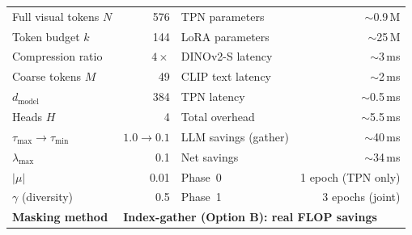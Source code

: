 \documentclass[11pt,a4paper]{article}
\begin{document}
\begin{keybox}[title={Key Numbers at a Glance}]
\renewcommand{\arraystretch}{1.15}
\small
\begin{tabular}{@{}lr||lr@{}}
  Full visual tokens $N$   & 576  & TPN parameters      & $\sim$0.9\,M \\
  Token budget $k$         & 144  & LoRA parameters     & $\sim$25\,M  \\
  Compression ratio        & $4\times$ & DINOv2-S latency & $\sim$3\,ms \\
  Coarse tokens $M$        & 49   & CLIP text latency   & $\sim$2\,ms  \\
  $d_{\text{model}}$       & 384  & TPN latency         & $\sim$0.5\,ms \\
  Heads $H$                & 4    & Total overhead      & $\sim$5.5\,ms \\
  $\tau_{\max}\to\tau_{\min}$ & $1.0\to0.1$ & LLM savings (gather) & $\sim$40\,ms \\
  $\lambda_{\max}$         & 0.1  & Net savings         & $\sim$34\,ms \\
  $|\mu|$                  & 0.01 & Phase~0             & 1 epoch (TPN only) \\
  $\gamma$ (diversity)     & 0.5  & Phase~1             & 3 epochs (joint) \\
  \textbf{Masking method}  & \multicolumn{3}{l}{\textbf{Index-gather (Option B): real FLOP savings}} \\
\end{tabular}
\end{keybox}
\end{document}

